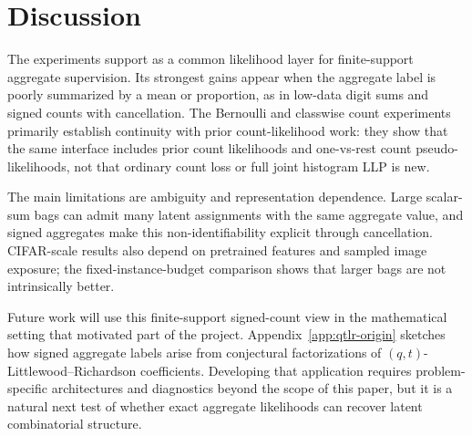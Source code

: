 \section{Discussion}
\label{sec:discussion}

The experiments support \method{} as a common likelihood layer for finite-support aggregate supervision.
Its strongest gains appear when the aggregate label is poorly summarized by a mean or proportion, as in low-data digit sums and signed counts with cancellation.
The Bernoulli and classwise count experiments primarily establish continuity with prior count-likelihood work: they show that the same interface includes prior count likelihoods and one-vs-rest count pseudo-likelihoods, not that ordinary count loss or full joint histogram LLP is new.

The main limitations are ambiguity and representation dependence.
Large scalar-sum bags can admit many latent assignments with the same aggregate value, and signed aggregates make this non-identifiability explicit through cancellation.
CIFAR-scale results also depend on pretrained features and sampled image exposure; the fixed-instance-budget comparison shows that larger bags are not intrinsically better.

Future work will use this finite-support signed-count view in the mathematical setting that motivated part of the project.
Appendix~\ref{app:qtlr-origin} sketches how signed aggregate labels arise from conjectural factorizations of $(q,t)$-Littlewood--Richardson coefficients.
Developing that application requires problem-specific architectures and diagnostics beyond the scope of this paper, but it is a natural next test of whether exact aggregate likelihoods can recover latent combinatorial structure.
